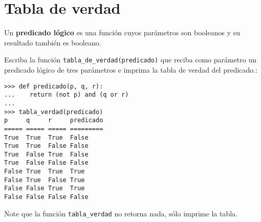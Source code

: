 \section{Tabla de verdad}

Un \textbf{predicado lógico} es una función cuyos parámetros son
booleanos y su resultado también es booleano.

Escriba la función \lstinline!tabla_de_verdad(predicado)! que reciba
como parámetro un predicado lógico de tres parámetros e imprima la tabla
de verdad del predicado.:

\begin{lstlisting}
>>> def predicado(p, q, r):
...    return (not p) and (q or r)
...
>>> tabla_verdad(predicado)
p     q     r     predicado
===== ===== ===== =========
True  True  True  False
True  True  False False
True  False True  False
True  False False False
False True  True  True
False True  False True
False False True  True
False False False False
\end{lstlisting}

Note que la función \lstinline!tabla_verdad! no retorna nada, sólo
imprime la tabla.
